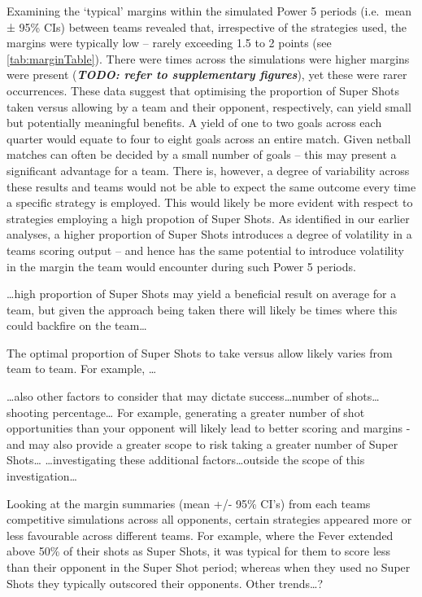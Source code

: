 \documentclass[]{elsarticle} %
\begin{document}
Examining the `typical' margins within the simulated Power 5 periods
(i.e.~mean ± 95\% CIs) between teams revealed that, irrespective of the
strategies used, the margins were typically low -- rarely exceeding 1.5
to 2 points (see \ref{tab:marginTable}). There were times across the
simulations were higher margins were present (\textbf{\emph{TODO: refer
to supplementary figures}}), yet these were rarer occurrences. These
data suggest that optimising the proportion of Super Shots taken versus
allowing by a team and their opponent, respectively, can yield small but
potentially meaningful benefits. A yield of one to two goals across each
quarter would equate to four to eight goals across an entire match.
Given netball matches can often be decided by a small number of goals --
this may present a significant advantage for a team. There is, however,
a degree of variability across these results and teams would not be able
to expect the same outcome every time a specific strategy is employed.
This would likely be more evident with respect to strategies employing a
high propotion of Super Shots. As identified in our earlier analyses, a
higher proportion of Super Shots introduces a degree of volatility in a
teams scoring output -- and hence has the same potential to introduce
volatility in the margin the team would encounter during such Power 5
periods.

\ldots high proportion of Super Shots may yield a beneficial result on
average for a team, but given the approach being taken there will likely
be times where this could backfire on the team\ldots{}

The optimal proportion of Super Shots to take versus allow likely varies
from team to team. For example, \ldots{}

\ldots also other factors to consider that may dictate
success\ldots number of shots\ldots shooting percentage\ldots{} For
example, generating a greater number of shot opportunities than your
opponent will likely lead to better scoring and margins - and may also
provide a greater scope to risk taking a greater number of Super
Shots\ldots{} \ldots investigating these additional
factors\ldots outside the scope of this investigation\ldots{}

Looking at the margin summaries (mean +/- 95\% CI's) from each teams
competitive simulations across all opponents, certain strategies
appeared more or less favourable across different teams. For example,
where the Fever extended above 50\% of their shots as Super Shots, it
was typical for them to score less than their opponent in the Super Shot
period; whereas when they used no Super Shots they typically outscored
their opponents. Other trends\ldots?
\end{document}
